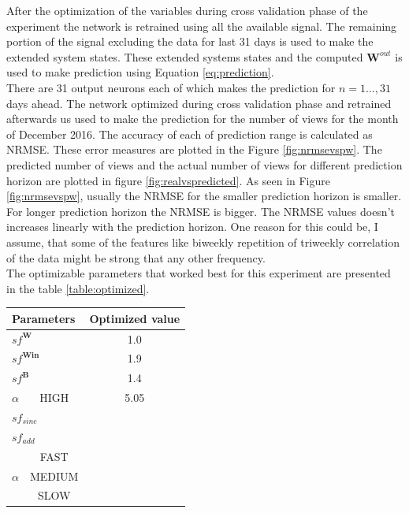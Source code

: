 
\indent \indent
After the optimization of the variables during cross validation phase of the experiment the network is retrained using all the available signal.  The remaining portion of the signal excluding the data for last 31 days is used to make the extended system states. These extended systems states and the computed $\textbf{W}^{out}$ is used to make prediction using Equation \ref{eq:prediction}. \\
There are 31 output neurons each of which makes the prediction for $n=1\hdots,31$ days ahead. The network optimized during cross validation phase and retrained afterwards us used to make the prediction for the number of views for the month of December 2016. The accuracy of each of prediction range is calculated as NRMSE. These error measures are plotted in the Figure \ref{fig:nrmsevspw}. The predicted number of views and the actual number of views for different prediction horizon are plotted in figure \ref{fig:realvspredicted}. As seen in Figure \ref{fig:nrmsevspw}, usually the NRMSE for the smaller prediction horizon is smaller. For longer prediction horizon the NRMSE is bigger. The NRMSE values doesn't increases linearly with the prediction horizon. One reason for this could be, I assume, that some of the features like biweekly repetition of triweekly correlation of the data might be strong that any other frequency.
\\
The optimizable parameters that worked best for this experiment are presented in the table \ref{table:optimized}.

	\begin{center}
	 \label{table:optimized} 
	\begin{tabular}{|c|c|c|} \hline
		 \multicolumn{2}{|l|}{ Parameters }& Optimized value\\ \hline
		 \multicolumn{2}{|l|}{ $sf^{\mathbf{W}}$}& 1.0\\ \hline
		 \multicolumn{2}{|l|}{$sf^{\mathbf{Win}}$}& 1.9 \\ \hline
		 \multicolumn{2}{|l|}{$sf^{\mathbf{B}}$}& 1.4\\ \hline
		  $\alpha$& HIGH& 5.05\\ \hline
		 \multicolumn{2}{|l|}{$sf_{sine}$} &\\ \hline
		 \multicolumn{2}{|l|}{ $sf_{add}$} &  \\ \hline
		 \multirow{3}{*}{$\alpha$} & FAST & \\ \cline{2-3}
		                   & MEDIUM &\\ \cline{2-3}
						   & SLOW &   \\\hline		 
	\end{tabular}
	\end{center}
	
